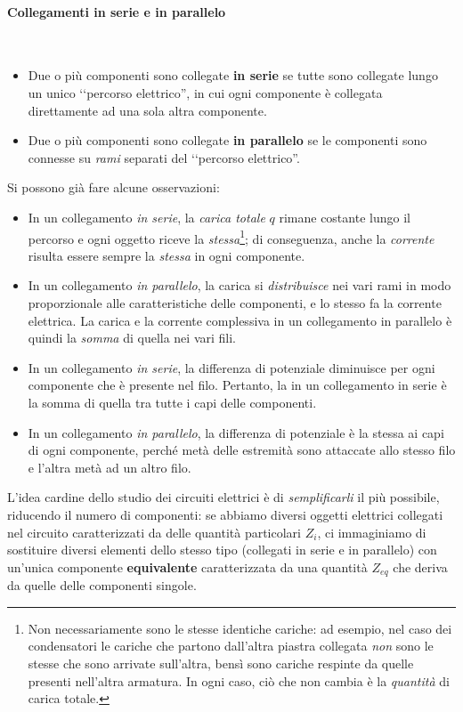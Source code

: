 \paragraph{Collegamenti in serie e in parallelo}
\begin{define}~
	\begin{itemize}
		\item Due o più componenti sono collegate \textbf{in serie} se tutte sono collegate lungo un unico ‘‘percorso elettrico'', in cui ogni componente è collegata direttamente ad una sola altra componente.
		\item Due o più componenti sono collegate \textbf{in parallelo} se le componenti sono connesse su \textit{rami} separati del ‘‘percorso elettrico''.
	\end{itemize}
\end{define}
Si possono già fare alcune osservazioni:
\begin{itemize}
	\item In un collegamento \textit{in serie}, la \textit{carica totale} $q$ rimane costante lungo il percorso e ogni oggetto riceve la \textit{stessa}\footnote{Non necessariamente sono le stesse identiche cariche: ad esempio, nel caso dei condensatori le cariche che partono dall'altra piastra collegata \textit{non} sono le stesse che sono arrivate sull'altra, bensì sono cariche respinte da quelle presenti nell'altra armatura. In ogni caso, ciò che non cambia è la \textit{quantità} di carica totale.}; di conseguenza, anche la \textit{corrente} risulta essere sempre la \textit{stessa} in ogni componente.
	\item In un collegamento \textit{in parallelo}, la carica si \textit{distribuisce} nei vari rami in modo proporzionale alle caratteristiche delle componenti, e lo stesso fa la corrente elettrica. La carica e la corrente complessiva in un collegamento in parallelo è quindi la \textit{somma} di quella nei vari fili.
	\item In un collegamento \textit{in serie}, la differenza di potenziale diminuisce per ogni componente che è presente nel filo. Pertanto, la \ddp in un collegamento in serie è la somma di quella tra tutte i capi delle componenti.
	\item In un collegamento \textit{in parallelo}, la differenza di potenziale è la stessa ai capi di ogni componente, perché metà delle estremità sono attaccate allo stesso filo e l'altra metà ad un altro filo.
\end{itemize}
L'idea cardine dello studio dei circuiti elettrici è di \textit{semplificarli} il più possibile, riducendo il numero di componenti: se abbiamo diversi oggetti elettrici collegati nel circuito caratterizzati da delle quantità particolari $Z_i$, ci immaginiamo di sostituire diversi elementi dello stesso tipo (collegati in serie e in parallelo) con un'unica componente \textbf{equivalente} caratterizzata da una quantità $Z_{eq}$ che deriva da quelle delle componenti singole.
